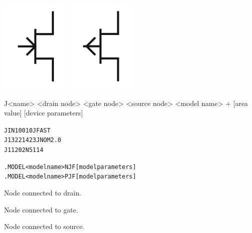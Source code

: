 


\begin{Device}\label{J_DEVICE}

\symbol
{\includegraphics{njfetSymbol}}
{\includegraphics{pjfetSymbol}}

\device
J<name> <drain node> <gate node> <source node> <model name>
+ [area value] [device parameters]

\examples
\begin{alltt}
JIN 100 1 0 JFAST
J13 22 14 23 JNOM 2.0
J1 1 2 0 2N5114
\end{alltt}

\model
\begin{alltt}
.MODEL <model name> NJF [model parameters]
.MODEL <model name> PJF [model parameters]
\end{alltt}

\parameters

\begin{Parameters}

Node connected to drain.

Node connected to gate.

 Node connected to source.


\end{Parameters}
\end{Device}
